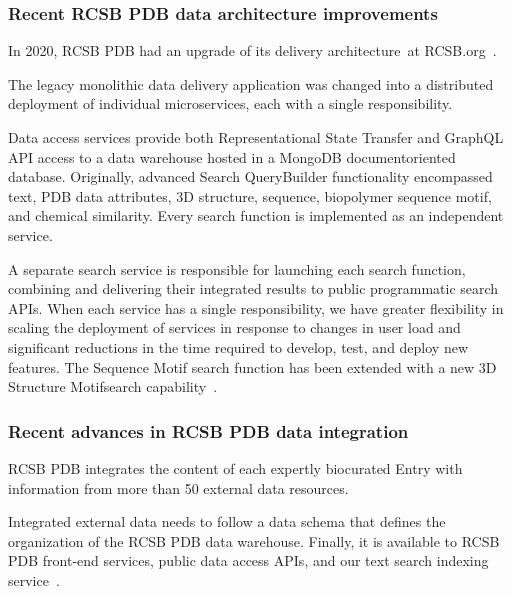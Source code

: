 \documentclass[]{final_report}
\begin{document}
\subsubsection{Recent RCSB PDB data architecture improvements}

In 2020, RCSB PDB had an upgrade of its delivery architecture~\cite{rose_rcsb_2021}at RCSB.org~\cite{powerful_rcsb_2021}. 

The legacy monolithic data delivery application was changed into a distributed deployment of individual microservices, each with a single responsibility. 

Data access services provide both Representational State Transfer and GraphQL API access to a data warehouse hosted in a MongoDB documentoriented database. Originally, advanced Search QueryBuilder functionality encompassed text, PDB data attributes, 3D structure, sequence, biopolymer sequence motif, and chemical similarity. Every search function is implemented as an independent service.

A separate search service is responsible for launching each search function, combining and delivering their integrated results to public programmatic search APIs. When each service has a single responsibility, we have greater flexibility in scaling the deployment of services in response to changes in user load and significant reductions in the time required to develop, test, and deploy new features. The Sequence Motif search function has been extended with a new 3D Structure Motifsearch capability~\cite{bittrich_real-time_2020}. 

\subsubsection{Recent advances in RCSB PDB data integration}

RCSB PDB integrates the content of each expertly biocurated Entry with information from more than 50 external data resources. 

Integrated external data needs to follow a data schema that defines the organization of the RCSB PDB data warehouse. Finally, it is available to RCSB PDB front-end services, public data access APIs, and our text search indexing service~\cite{burley_rcsb_2022}.
\end{document}
